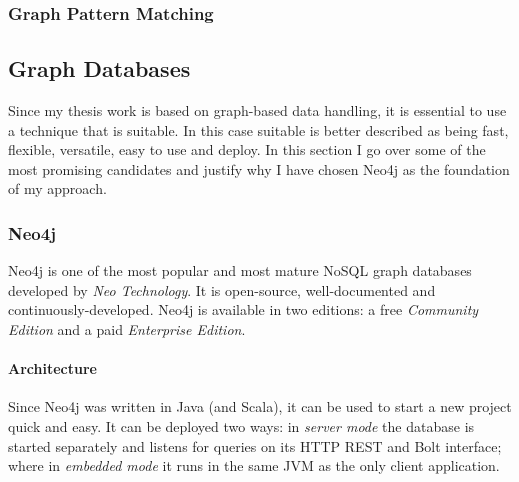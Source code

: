 \subsubsection{Graph Pattern Matching}


\subsection{Graph Databases}
\label{sect:graph-databases}
Since my thesis work is based on graph-based data handling, it is essential to use a technique that is suitable. In this case suitable is better described as being fast, flexible, versatile, easy to use and deploy. In this section I go over some of the most promising candidates and justify why I have chosen Neo4j as the foundation of my approach.

\subsubsection{Neo4j}
\label{sect:neo4j}
Neo4j is one of the most popular and most mature NoSQL graph databases developed by \emph{Neo Technology}. It is open-source, well-documented and continuously-developed. Neo4j is available in two editions: a free \emph{Community Edition} and a paid \emph{Enterprise Edition}.~\cite{neo4j}

\paragraph{Architecture}
Since Neo4j was written in Java (and Scala), it can be used to start a new project quick and easy. It can be deployed two ways: in \emph{server mode} the database is started separately and listens for queries on its HTTP REST and Bolt interface; where in \emph{embedded mode} it runs in the same JVM as the only client application.

